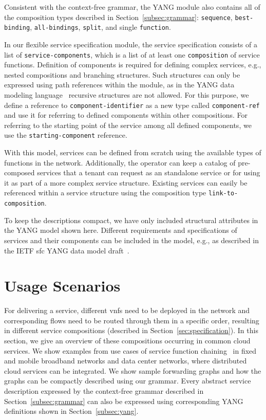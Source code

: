 \documentclass{sig-alternate-per}
\begin{document}
Consistent with the context-free grammar,
the YANG module also contains all of the composition types described in 
Section~\ref{subsec:grammar}: \texttt{sequence}, 
\texttt{best-binding}, \texttt{all-bindings}, \texttt{split}, and single \texttt{function}.

In our flexible service specification module, the service
specification consists of a list of \texttt{service-components}, which is a list of 
at least one \texttt{composition} of service functions. 
Definition of components is required for defining complex services, e.g., nested compositions
and branching structures. Such structures can only be expressed using path references within the 
module, as in the YANG data modeling language~\cite{rfc6020} recursive structures are 
not allowed. For this purpose, we define a reference
to \texttt{component-identifier} as a new type called \texttt{component-ref} 
and use it for referring to defined components within other compositions. For 
referring to the starting point of the service among all defined components, we 
use the \texttt{starting-component} reference.

With this model, services can be defined from scratch using the available types of functions in the 
network. Additionally, the operator can keep a catalog of pre-composed services that a 
tenant can request as an standalone service or for using it as part of a more 
complex service structure. Existing services can easily be referenced within a 
service structure using the composition type \texttt{link-to-composition}. 

To keep the descriptions compact, we have only included structural attributes in the
YANG model shown here. Different requirements and specifications of services and 
their components can be included in the model, e.g., as described in the
IETF \ac{sfc} YANG data model draft~\cite{draft-penno-sfc-yang-11}.


\section{Usage Scenarios}
\label{sec:usecases}

For delivering a service, different \acp{vnf} need to be deployed 
in the network and corresponding flows need to be routed through them in a specific 
order, resulting in different service compositions (described in Section~\ref{sec:specification}).
In this section, we give an overview of these compositions occurring in common 
cloud services. We show examples from use cases of service function
chaining~\cite{broadbandforum, draft-ietf-sfc-use-case-mobility-03,
draft-ietf-sfc-dc-use-cases-02, draft-liu-sfc-use-cases-08} in fixed and mobile
broadband networks and data center networks, where distributed cloud services 
can be integrated. We show sample forwarding graphs and how the graphs can be compactly
described using our grammar. Every abstract service description expressed by the 
context-free grammar described in Section~\ref{subsec:grammar} can also be expressed 
using corresponding YANG definitions shown in Section~\ref{subsec:yang}. 
\end{document}
